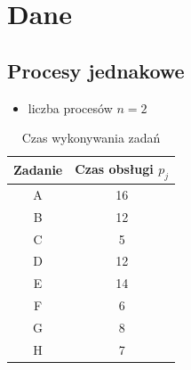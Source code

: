 \documentclass[
    12pt, %
]{../fphw}
\begin{document}
\section{Dane}
\subsection{Procesy jednakowe}
\begin{itemize}
    \item liczba procesów \(n = 2\)
\end{itemize}
\begin{table}[H]
    \centering
    \begin{tabular}{| c | c |}
        \hline
        Zadanie & Czas obsługi \(p_j\) \\
        \hline
        A       & 16                   \\
        B       & 12                   \\
        C       & 5                    \\
        D       & 12                   \\
        E       & 14                   \\
        F       & 6                    \\
        G       & 8                    \\
        H       & 7                    \\
        \hline
    \end{tabular}
    \caption{Czas wykonywania zadań}
\end{table}
\end{document}
